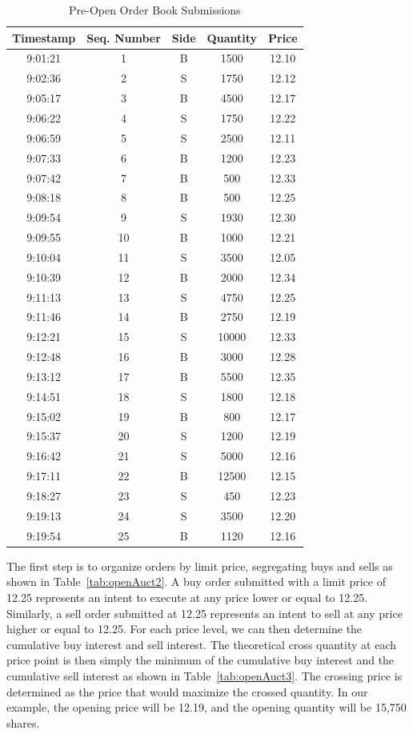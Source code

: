 \begin{table}[!ht]
   \centering
   \caption{Pre-Open Order Book Submissions\label{tab:openAuct}}
   \hspace*{-2.0cm}
   \begin{tabular}{ccccc} 
	Timestamp & Seq. Number & Side & Quantity & Price \\ \hline
	9:01:21 & 1  &  B & 1500 &  12.10 \\
	9:02:36 & 2  &  S & 1750 & 12.12 \\	
	9:05:17 & 3  &  B & 4500  & 12.17 \\	
	9:06:22 & 4  &  S & 1750 & 12.22 \\
	9:06:59 & 5  &  S & 2500 & 12.11 \\	
	9:07:33 & 6 &  B & 1200 & 12.23 \\	
	9:07:42 & 7  &  B & 500 & 12.33 \\	
	9:08:18 & 8 &  B & 500 & 12.25 \\	
	9:09:54 & 9 &  S & 1930 & 12.30 \\	
	9:09:55 & 10 & B & 1000 & 12.21 \\	
	9:10:04 & 11 & S & 3500 & 12.05 \\	
	9:10:39 & 12 & B & 2000 & 12.34 \\	
	9:11:13 & 13 &  S & 4750 & 12.25 \\	
	9:11:46 &  14 & B  & 2750 & 12.19 \\	
	9:12:21 &  15 & S  & 10000 & 12.33 \\	
	9:12:48 &  16 & B  & 3000 & 12.28 \\	
	9:13:12 &  17 & B  & 5500 & 12.35 \\
	9:14:51 &  18 & S & 1800 & 12.18 \\
	9:15:02 &  19 & B & 800 & 12.17 \\
	9:15:37 &  20 & S & 1200 & 12.19 \\
	9:16:42 &  21 & S & 5000 & 12.16 \\
	9:17:11 &  22 & B & 12500 & 12.15 \\
	9:18:27 &  23 & S & 450 & 12.23 \\
	9:19:13 &  24 & S & 3500 & 12.20 \\	
	9:19:54 &  25 & B & 1120 & 12.16
   \end{tabular}
\end{table}

The first step is to organize orders by limit price, segregating buys and sells as shown in Table~\ref{tab:openAuct2}. A buy order submitted with a limit price of 12.25 represents an intent to execute at any price lower or equal to 12.25. Similarly, a sell order submitted at 12.25 represents an intent to sell at any price higher or equal to 12.25. For each price level, we can then determine the cumulative buy interest and sell interest. The theoretical cross quantity at each price point is then simply the minimum of the cumulative buy interest and the cumulative sell interest as shown in Table~\ref{tab:openAuct3}. The crossing price is determined as the price that would maximize the crossed quantity. In our example, the opening price will be 12.19, and the opening quantity will be 15,750 shares. \\

